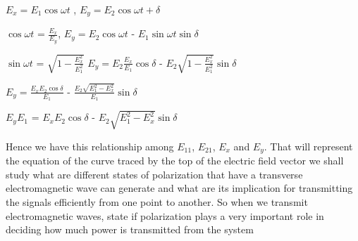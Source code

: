 $E_x = E_{1}\cos\omega t$ , $E_y  = E_{2}\cos\omega t + \delta$

$\cos\omega t$ = $\frac{E_x}{E_y}$, $E_y = E_{2}\cos\omega t$ - $E_{1}\sin\omega t\sin\delta$

$\sin\omega t$ = $\sqrt{1 - \frac{E_x^2}{E_{1}^2}}$ $E_y = E_{2}\frac{E_x}{E_{1}}\cos\delta$ - $E_{2}\sqrt{1 - \frac{E_x^2}{E_{1}^2}}\sin\delta$

$E_y = \frac{E_xE_{2}\cos\delta}{E_{1}}$ - $\frac{E_{2}\sqrt{E_{1}^2 - E_x^2}}{E_{1}}\sin\delta$

$E_yE_{1}$ = $E_xE_{2}\cos\delta$ - $E_{2}\sqrt{E_{1}^2 - E_x^2}\sin\delta$

Hence we have this relationship among $E_{11}$, $E_{21}$, $E_x$ and $E_y$. That will represent the equation of the curve traced by the top of the electric field vector we shall study what are different states of polarization that have a transverse electromagnetic wave can generate and what are its implication for transmitting the signals efficiently from one point to another. So when we transmit electromagnetic waves, state if polarization plays a very important role in deciding how much power is transmitted from the system	
